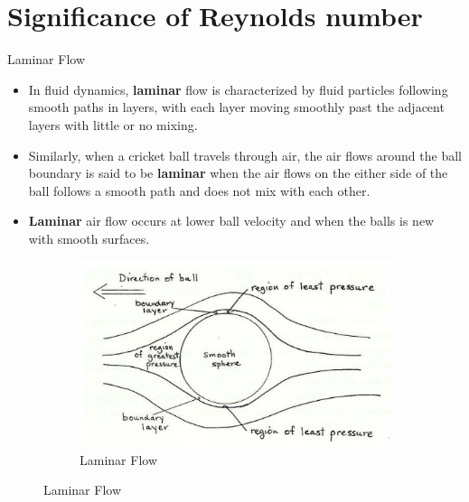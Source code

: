 \documentclass{beamer}
\begin{document}
\section{Significance of Reynolds number}
\begin{frame}{Laminar Flow}
    \begin{itemize}
    \item 
    In fluid dynamics, \textbf{laminar} flow is characterized by fluid particles following smooth paths in layers, with each layer moving smoothly past the adjacent layers with little or no mixing. 
    
    \item
    Similarly, when a cricket ball travels through air, the  air flows around the ball boundary is said to be \textbf{laminar} when the air flows on the either side of the ball follows a smooth path and does not mix with each other.   
    
    \item
    \textbf{Laminar} air flow occurs at lower ball velocity and when the balls is new with smooth surfaces.
    
  \end{itemize}
\begin{figure}[h!]
  \centering
  \begin{subfigure}[b]{0.4\linewidth}
    \includegraphics[width=\linewidth]{./figs/laminar.png}
    \caption{Laminar Flow}
  \end{subfigure}
\end{figure}
  
  
\end{frame} 
\end{document}
